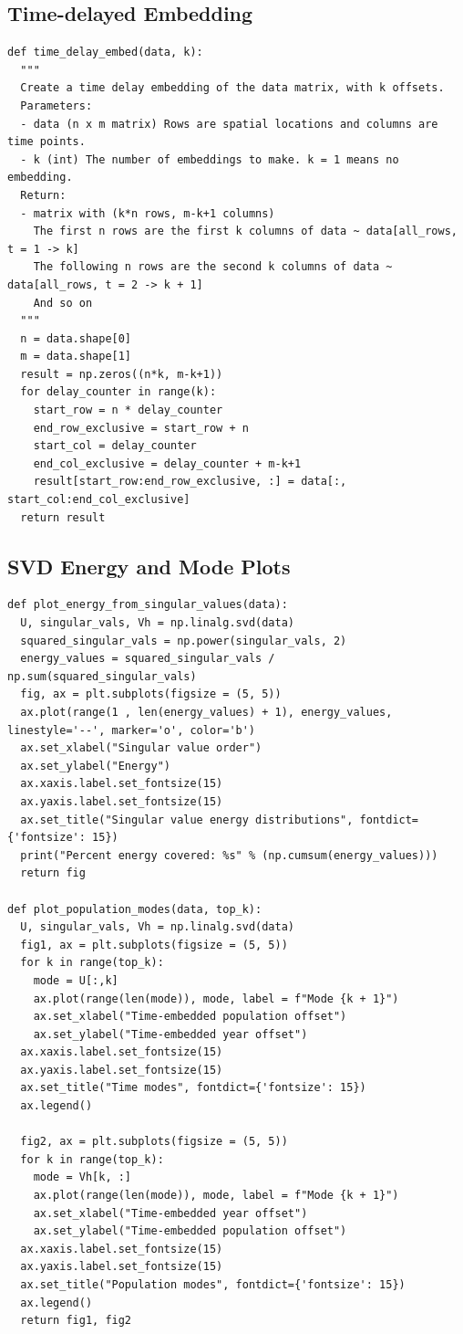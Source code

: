 \documentclass[letterpaper, 10 pt, conference]{ieeeconf}  %
\begin{document}
\subsection*{Time-delayed Embedding}
\begin{verbatim}
def time_delay_embed(data, k):
  """
  Create a time delay embedding of the data matrix, with k offsets.
  Parameters:
  - data (n x m matrix) Rows are spatial locations and columns are time points.
  - k (int) The number of embeddings to make. k = 1 means no embedding.
  Return:
  - matrix with (k*n rows, m-k+1 columns)
    The first n rows are the first k columns of data ~ data[all_rows, t = 1 -> k]
    The following n rows are the second k columns of data ~ data[all_rows, t = 2 -> k + 1]
    And so on
  """
  n = data.shape[0]
  m = data.shape[1]
  result = np.zeros((n*k, m-k+1))
  for delay_counter in range(k):
    start_row = n * delay_counter
    end_row_exclusive = start_row + n
    start_col = delay_counter
    end_col_exclusive = delay_counter + m-k+1
    result[start_row:end_row_exclusive, :] = data[:, start_col:end_col_exclusive]
  return result
\end{verbatim}

\subsection*{SVD Energy and Mode Plots}
\begin{verbatim}
def plot_energy_from_singular_values(data):
  U, singular_vals, Vh = np.linalg.svd(data)
  squared_singular_vals = np.power(singular_vals, 2)
  energy_values = squared_singular_vals / np.sum(squared_singular_vals)
  fig, ax = plt.subplots(figsize = (5, 5))
  ax.plot(range(1 , len(energy_values) + 1), energy_values, linestyle='--', marker='o', color='b')
  ax.set_xlabel("Singular value order")
  ax.set_ylabel("Energy")
  ax.xaxis.label.set_fontsize(15)
  ax.yaxis.label.set_fontsize(15)
  ax.set_title("Singular value energy distributions", fontdict={'fontsize': 15})
  print("Percent energy covered: %s" % (np.cumsum(energy_values)))
  return fig

def plot_population_modes(data, top_k):
  U, singular_vals, Vh = np.linalg.svd(data)
  fig1, ax = plt.subplots(figsize = (5, 5))
  for k in range(top_k):
    mode = U[:,k]
    ax.plot(range(len(mode)), mode, label = f"Mode {k + 1}")
    ax.set_xlabel("Time-embedded population offset")
    ax.set_ylabel("Time-embedded year offset")
  ax.xaxis.label.set_fontsize(15)
  ax.yaxis.label.set_fontsize(15)
  ax.set_title("Time modes", fontdict={'fontsize': 15})
  ax.legend()

  fig2, ax = plt.subplots(figsize = (5, 5))
  for k in range(top_k):
    mode = Vh[k, :]
    ax.plot(range(len(mode)), mode, label = f"Mode {k + 1}")
    ax.set_xlabel("Time-embedded year offset")
    ax.set_ylabel("Time-embedded population offset")
  ax.xaxis.label.set_fontsize(15)
  ax.yaxis.label.set_fontsize(15)
  ax.set_title("Population modes", fontdict={'fontsize': 15})
  ax.legend()
  return fig1, fig2
\end{verbatim}
\end{document}
